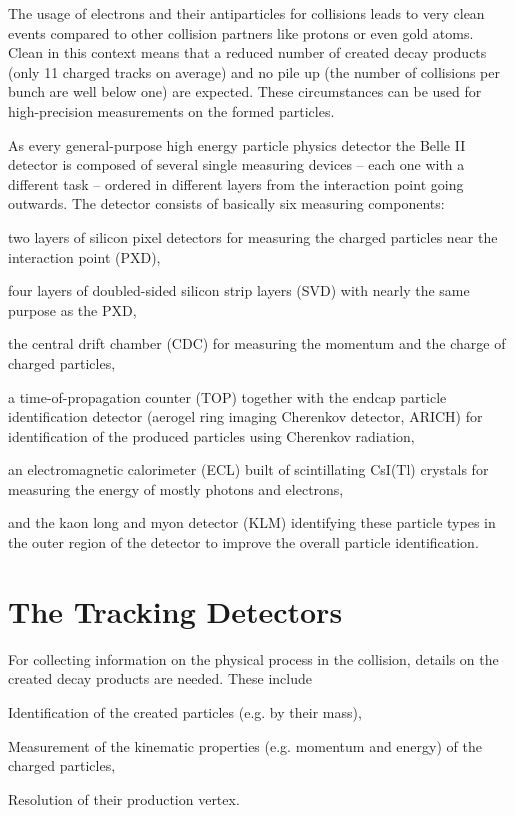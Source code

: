 The usage of electrons and their antiparticles for collisions leads to very clean events compared to other collision partners like protons or even gold atoms. Clean in this context means that a reduced number of created decay products (only 11 charged tracks on average) and no pile up (the number of collisions per bunch are well below one) are expected. These circumstances can be used for high-precision measurements on the formed particles.

As every general-purpose high energy particle physics detector the Belle II detector is composed of several single measuring devices -- each one with a different task -- ordered in different layers from the interaction point going outwards. The detector consists of basically six measuring components:
\begin{zlist}
  \item two layers of silicon pixel detectors for measuring the charged particles near the interaction point (PXD),
  \item four layers of doubled-sided silicon strip layers (SVD) with nearly the same purpose as the PXD,
  \item the central drift chamber (CDC) for measuring the momentum and the charge of charged particles,
  \item a time-of-propagation counter (TOP) together with the endcap particle identification detector (aerogel ring imaging Cherenkov detector, ARICH) for identification of the produced particles using Cherenkov radiation,
  \item an electromagnetic calorimeter (ECL) built of scintillating CsI(Tl) crystals for measuring the energy of mostly photons and electrons,
  \item and the kaon long and myon detector (KLM) identifying these particle types in the outer region of the detector to improve the overall particle identification.
\end{zlist}

\section{The Tracking Detectors}

For collecting information on the physical process in the collision, details on the created decay products are needed. These include
\begin{zlist}
 \item Identification of the created particles (e.g. by their mass),
 \item Measurement of the kinematic properties (e.g. momentum and energy) of the charged particles,
 \item Resolution of their production vertex.
\end{zlist}


